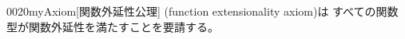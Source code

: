 \documentclass[index]{subfiles}
\begin{document}
\begin{myBlock}{0020}{myAxiom}[関数外延性公理]
  (function extensionality axiom)は
  すべての関数型が関数外延性を満たすことを要請する。
\end{myBlock}
\end{document}
